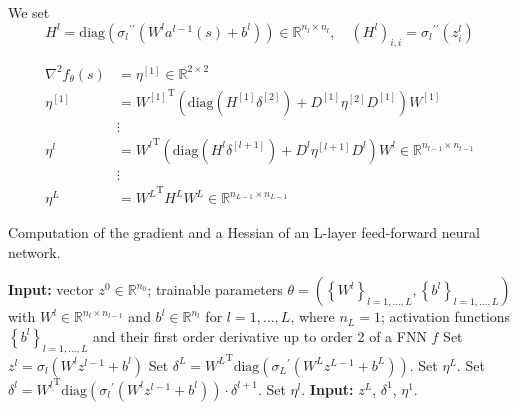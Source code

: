 We set 
\begin{equation*}
    H^{l} = \mathrm{diag}\left({\sigma_{l}}^{\prime \prime}\left(W^{l} a^{l-1}\left(s\right) + b^{l}\right)\right) \in \mathbb{R}^{n_l \times n_l}, \quad \left(H^{l}\right)_{i, i} = {\sigma_{l}}^{\prime \prime} \left(z_{i}^{l}\right)
\end{equation*}

\begin{align*}
    \nabla^{2} f_{\theta}\left(s\right) & = \eta^{[1]} \in \mathbb{R}^{2 \times 2} \\
    \eta^{[1]} & = {W^{[1]}}^{\mathrm{T}} \left( \mathrm{diag}\left(H^{[1]} \delta^{[2]}\right) + D^{[1]} \eta^{[2]} D^{[1]} \right) W^{[1]} \\
    & \vdots \\
    \eta^{l} & = {W^{l}}^{\mathrm{T}} \left( \mathrm{diag}\left(H^{l} \delta^{[l+1]}\right) + D^{l} \eta^{[l+1]} D^{l} \right) W^{l} \in \mathbb{R}^{n_{l-1} \times n_{l-1}} \\
    & \vdots \\
    \eta^{L} & = {W^{L}}^{\mathrm{T}} H^{L} W^{L} \in \mathbb{R}^{n_{L-1} \times n_{L-1}}
\end{align*} 


\begin{algorithm}[H]
    \caption{Computation of the gradient and a Hessian of an L-layer feed-forward neural network.}
    \begin{algorithmic}[1]
        \State \textbf{Input:} vector $z^0 \in \mathbb{R}^{n_0}$; trainable parameters $\theta = \left(\left\{ W^l \right\}_{l = 1, \ldots, L}, \left\{ b^l \right\}_{l = 1, \ldots, L}\right)$ with $W^l \in \mathbb{R}^{n_l \times n_{l-1}}$ and $b^l \in \mathbb{R}^{n_l}$ for $l = 1, \ldots, L$, where $n_L = 1$; activation functions $\left\{ b^l \right\}_{l = 1, \ldots, L}$ and their first order derivative up to order 2 of a FNN $f$
            \State Set $z^l = \sigma_l\left(W^l z^{l-1} + b^l\right)$
        \EndFor
        \State Set $\delta^{L} = {W^{L}}^{\mathrm{T}} \mathrm{diag}\left({\sigma_{L}}^{\prime}\left(W^{L} z^{L-1} + b^{L}\right)\right)$.
        \State Set $\eta^{L}$.
            \State Set $\delta^{l} = {W^{l}}^{\mathrm{T}} \mathrm{diag}\left({\sigma_{l}}^{\prime}\left(W^{l} z^{l-1} + b^{l}\right)\right) \cdot \delta^{l+1}$.
            \State Set $\eta^{l}$.
        \EndFor
        \State \textbf{Input:} $z^L$, $\delta^1$, $\eta^1$.
    \end{algorithmic}
\end{algorithm}





